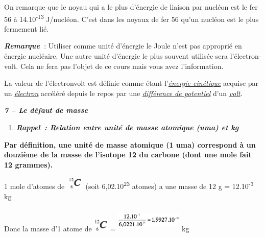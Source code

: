 On remarque que le noyau qui a le plus d'énergie de liaison par nucléon
est le fer 56 à 14.10\textsuperscript{-13} J/nucléon. C'est dans les
noyaux de fer 56 qu'un nucléon est le plus fermement lié.

\emph{\textbf{Remarque~}}: Utiliser comme unité d'énergie le Joule n'est
pas approprié en énergie nucléaire. Une autre unité d'énergie le plus
souvent utilisée sera l'électron-volt. Cela ne fera pas l'objet de ce
cours mais vous avez l'information.

La valeur de l'électronvolt est définie comme étant
l'\href{https://fr.wikipedia.org/wiki/\%C3\%89nergie_cin\%C3\%A9tique}{\emph{\emph{énergie
cinétique}}} acquise par un
\href{https://fr.wikipedia.org/wiki/\%C3\%89lectron}{\emph{\emph{électron}}}
accéléré depuis le repos par une
\href{https://fr.wikipedia.org/wiki/Potentiel_\%C3\%A9lectrique}{\emph{\emph{différence
de potentiel}}} d'un
\href{https://fr.wikipedia.org/wiki/Volt}{\emph{\emph{volt}}}.

\emph{\textbf{7 -- Le défaut de masse}}

\begin{enumerate}
\def\labelenumi{\alph{enumi})}
\tightlist
\item
  \emph{\textbf{Rappel~: Relation entre unité de masse atomique (uma) et
  kg}}
\end{enumerate}

\textbf{Par définition, une unité de masse atomique (1 uma) correspond à
un douzième de la masse de l'isotope 12 du carbone (dont une mole fait
12 grammes).}

1 mole d'atomes de
\includegraphics[width=0.847cm,height=0.636cm]{Pictures/100000010000001400000013946388155A247608.png}
(soit 6,02.10\textsuperscript{23} atomes) a une masse de 12 g =
12.10\textsuperscript{-3} kg

Donc la masse d'1 atome de
\includegraphics[width=0.706cm,height=0.683cm]{Pictures/100000010000001400000013946388155A247608.png}
=
\includegraphics[width=3.176cm,height=1.177cm]{Pictures/10000001000000A8000000288EBA8C324C0C87D6.png}
kg

